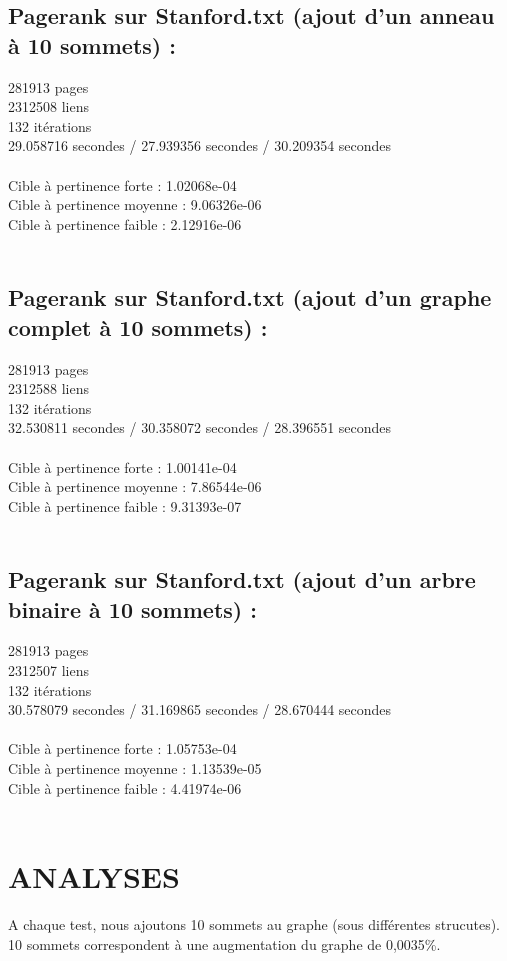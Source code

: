 \documentclass[a4paper,11pt]{article}
\begin{document}
	\subsection{Pagerank sur Stanford.txt (ajout d'un anneau à 10 sommets) :}
		281913 pages\\
		2312508 liens\\
		132 itérations\\
		29.058716 secondes / 27.939356 secondes / 30.209354 secondes\\
		\\
		Cible à pertinence forte : 1.02068e-04\\
		Cible à pertinence moyenne : 9.06326e-06\\
		Cible à pertinence faible : 2.12916e-06\\
		\\
	\subsection{Pagerank sur Stanford.txt (ajout d'un graphe complet à 10 sommets) :}
		281913 pages\\
		2312588 liens\\
		132 itérations\\
		32.530811 secondes / 30.358072 secondes / 28.396551 secondes\\
		\\
		Cible à pertinence forte : 1.00141e-04\\	
		Cible à pertinence moyenne : 7.86544e-06\\
		Cible à pertinence faible : 9.31393e-07\\
		\\
	\subsection{Pagerank sur Stanford.txt (ajout d'un arbre binaire à 10 sommets) :}
		281913 pages\\
		2312507 liens\\
		132 itérations\\
		30.578079 secondes / 31.169865 secondes / 28.670444 secondes\\
		\\
		Cible à pertinence forte : 1.05753e-04\\
		Cible à pertinence moyenne : 1.13539e-05\\
		Cible à pertinence faible : 4.41974e-06\\
		\\
\section{ANALYSES}
	A chaque test, nous ajoutons 10 sommets au graphe (sous différentes strucutes). 10 sommets correspondent à une augmentation du graphe de 0,0035\%.\\
\end{document}
